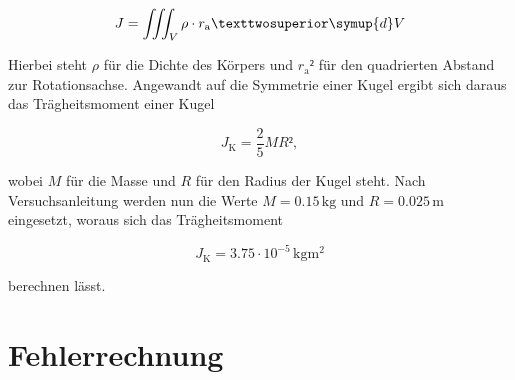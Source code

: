 \begin{equation*}
    J = \iiint_V \rho \cdot r_\text{a}² \symup{d}V
\end{equation*}

\noindent Hierbei steht $\rho$ für die Dichte des Körpers und $r_\text{a}²$ für den quadrierten Abstand zur Rotationsachse.
Angewandt auf die Symmetrie einer Kugel ergibt sich daraus das Trägheitsmoment einer Kugel

\begin{equation*}
    J_\text{K} = \frac{2}{5}MR²,
\end{equation*}

\noindent wobei $M$ für die Masse und $R$ für den Radius der Kugel steht. Nach Versuchsanleitung werden nun die Werte $M = 0.15\,\unit{\kilo\gram}$
und $R = 0.025\,\unit{\meter}$ eingesetzt, woraus sich das Trägheitsmoment

\begin{equation*}
    J_\text{K} = 3.75 \cdot 10^{-5}\,\unit{\kilo\gram\meter\squared}
\end{equation*}

\noindent berechnen lässt.
\section{Fehlerrechnung}
%